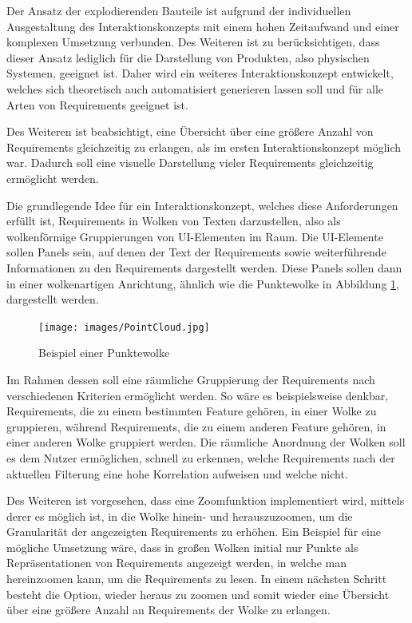 Der Ansatz der explodierenden Bauteile ist aufgrund der individuellen Ausgestaltung des Interaktionskonzepts mit einem hohen Zeitaufwand und einer komplexen Umsetzung verbunden.
Des Weiteren ist zu berücksichtigen, dass dieser Ansatz lediglich für die Darstellung von Produkten, also physischen Systemen, geeignet ist.
Daher wird ein weiteres Interaktionskonzept entwickelt, welches sich theoretisch auch automatisiert generieren lassen soll und für alle Arten von Requirements geeignet ist.

Des Weiteren ist beabsichtigt, eine Übersicht über eine größere Anzahl von Requirements gleichzeitig zu erlangen, als im ersten Interaktionskonzept möglich war.
Dadurch soll eine visuelle Darstellung vieler Requirements gleichzeitig ermöglicht werden.

Die grundlegende Idee für ein Interaktionskonzept, welches diese Anforderungen erfüllt ist, Requirements in Wolken von Texten darzustellen, also als wolkenförmige Gruppierungen von UI-Elementen im Raum.
Die UI-Elemente sollen Panels sein, auf denen der Text der Requirements sowie weiterführende Informationen zu den Requirements dargestellt werden.
Diese Panels sollen dann in einer wolkenartigen Anrichtung, ähnlich wie die Punktewolke in Abbildung \ref{fig:point-cloud}, dargestellt werden.


\begin{figure}[H]
    \centering
    \texttt{[image: images/PointCloud.jpg]}
    \caption{Beispiel einer Punktewolke}
    \label{fig:point-cloud}
  \end{figure}



Im Rahmen dessen soll eine räumliche Gruppierung der Requirements nach verschiedenen Kriterien ermöglicht werden.
So wäre es beispielsweise denkbar, Requirements, die zu einem bestimmten Feature gehören, in einer Wolke zu gruppieren, während Requirements, die zu einem anderen Feature gehören, in einer anderen Wolke gruppiert werden.
Die räumliche Anordnung der Wolken soll es dem Nutzer ermöglichen, schnell zu erkennen, welche Requirements nach der aktuellen Filterung eine hohe Korrelation aufweisen und welche nicht.

Des Weiteren ist vorgesehen, dass eine Zoomfunktion implementiert wird, mittels derer es möglich ist, in die Wolke hinein- und herauszuzoomen, um die Granularität der angezeigten Requirements zu erhöhen.
Ein Beispiel für eine mögliche Umsetzung wäre, dass in großen Wolken initial nur Punkte als Repräsentationen von Requirements angezeigt werden, in welche man hereinzoomen kann, um die Requirements zu lesen.
In einem nächsten Schritt besteht die Option, wieder heraus zu zoomen und somit wieder eine Übersicht über eine größere Anzahl an Requirements der Wolke zu erlangen.

